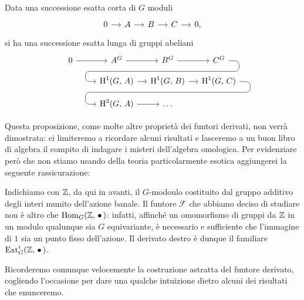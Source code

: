 \begin{theorem}\label{fond}
	Data una successione esatta corta di $ G $ moduli
	\[\begin{tikzcd}[column sep = small]
	0 \rar & A \rar & B \rar & C \rar & 0,
	\end{tikzcd}\]
	si ha una successione esatta lunga di gruppi abeliani
	\[\begin{tikzcd}[column sep = small, row sep = small]
	0 \rar
	&A^G \rar\arrow[d,phantom, ""{coordinate, name=A, near end}]
	& B^G \arrow[d,phantom, ""{coordinate, name=B}] \rar
	& C^G \arrow[dll, 
	rounded corners = 5 pt, 
	to path={ --([xshift=3ex]\tikztostart.east)
		|- (A)\tikztonodes
		-| ([xshift=-3ex]\tikztotarget.west)
		-- (\tikztotarget)}]  \\
	\qquad \quad
	&\HH^1(G, \, A)  \arrow[d,phantom, ""{coordinate, name=X}] \rar 
	& \HH^1(G, \, B) \arrow[d,phantom, ""{coordinate, name=Y}] \rar
	& \HH^1(G, \, C) \arrow[d,phantom, ""{coordinate, name=Z}] \arrow[dll, 
	rounded corners = 5 pt, 
	to path={ --([xshift=3ex]\tikztostart.east)
		|- (X)\tikztonodes
		-| ([xshift=-3ex]\tikztotarget.west)
		-- (\tikztotarget)}]  \\
	&\HH^2(G, \, A) \rar
	& \dots
	& \qquad \end{tikzcd}\]
\end{theorem}

Questa proposizione, come molte altre proprietà dei funtori derivati, non verrà dimostrata: ci limiteremo a ricordare alcuni risultati e lasceremo a un buon libro di algebra \cite{Weibel} il compito di indagare i misteri dell'algebra omologica. Per evidenziare però che non stiamo usando della teoria particolarmente esotica aggiungerei la seguente rassicurazione:

\begin{remark}
	Indichiamo con $ \mathbb{Z} $, da qui in avanti, il $ G $-modoulo costituito dal gruppo additivo degli interi munito dell'azione banale.  Il funtore $ \mathcal{F} $ che abbiamo deciso di studiare non è altro che $ \operatorname{Hom}_G(\mathbb{Z},\, \bullet\,) $: infatti, affinché un omomorfismo di gruppi da $ \mathbb{Z} $ in un modulo qualunque sia $ G $ equivariante, è necessario e sufficiente che l'immagine di $ 1 $ sia un punto fisso dell'azione. Il derivato destro è dunque il familiare $ \operatorname{Ext}^i_G(\mathbb{Z}, \, \bullet\,) $.
\end{remark}

Ricorderemo comunque velocemente la costruzione astratta del funtore derivato, cogliendo l'occasione per dare una qualche intuizione dietro alcuni dei risultati che enunceremo.

